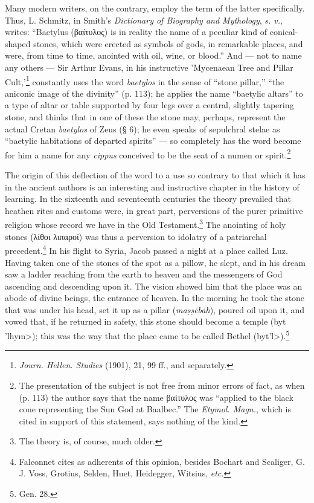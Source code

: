 \documentclass[a4paper, 12pt, oneside, polutonikogreek, english]{article}
\begin{document}
Many modern writers, on the contrary, employ the term of the latter specifically. Thus, L. Schmitz, in Smith's \emph{Dictionary of Biography and Mythology}, \emph{s. v.}, writes: ``Baetylus (βαίτυλος) is in reality the name of a peculiar kind of conical-shaped stones, which were erected as symbols of gods, in remarkable places, and were, from time to time, anointed with oil, wine, or blood.'' And --- not to name any others --- Sir Arthur Evans, in his instructive 'Mycenaean Tree and Pillar Cult,'\footnote{\emph{Journ. Hellen. Studies} (1901), 21, 99 ff., and separately.} constantly uses the word \emph{baetylos} in the sense of ``stone pillar,'' ``the aniconic image of the divinity'' (p. 113); he applies the name ``baetylic altars'' to a type of altar or table supported by four legs over a central, slightly tapering stone, and thinks that in one of these the stone may, perhaps, represent the actual Cretan \emph{baetylos} of Zeus (§ 6); he even speaks of sepulchral stelae as ``baetylic habitations of departed spirits'' --- so completely has the word become for him a name for any \emph{cippus} conceived to be the seat of a numen or spirit.\footnote{The presentation of the subject is not free from minor errors of fact, as when (p. 113) the author says that the name βαίτυλος was ``applied to the black cone representing the Sun God at Baalbec.'' The \emph{Etymol. Magn.}, which is cited in support of this statement, says nothing of the kind.}

The origin of this deflection of the word to a use so contrary to that which it has in the ancient authors is an interesting and instructive chapter in the history of learning. In the sixteenth and seventeenth centuries the theory prevailed that heathen rites and customs were, in great part, perversions of the purer primitive religion whose record we have in the Old Testament.\footnote{The theory is, of course, much older.} The anointing of holy stones (λίθοι λιπαροί) was thus a perversion to idolatry of a patriarchal precedent.\footnote{Falconnet cites as adherents of this opinion, besides Bochart and Scaliger, G. J. Voss, Grotius, Selden, Huet, Heidegger, Witsius, \emph{etc.}} In his flight to Syria, Jacob passed a night at a place called Luz. Having taken one of the stones of the spot as a pillow, he slept, and in his dream saw a ladder reaching from the earth to heaven and the messengers of God ascending and descending upon it. The vision showed him that the place was an abode of divine beings, the entrance of heaven. In the morning he took the stone that was under his head, set it up as a pillar (\emph{maṣṣēbāh}), poured oil upon it, and vowed that, if he returned in safety, this stone should become a temple (\<byt 'lhym>); this was the way that the place came to be called Bethel (\<byt'l>).\footnote{Gen. 28.}
\end{document}
